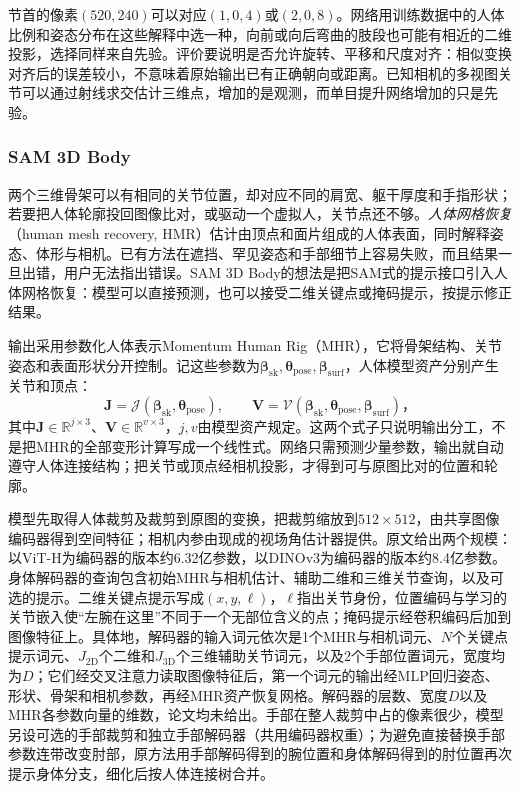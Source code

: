 节首的像素$(520,240)$可以对应$(1,0,4)$或$(2,0,8)$。网络用训练数据中的人体比例和姿态分布在这些解释中选一种，向前或向后弯曲的肢段也可能有相近的二维投影，选择同样来自先验。评价要说明是否允许旋转、平移和尺度对齐：相似变换对齐后的误差较小，不意味着原始输出已有正确朝向或距离。已知相机的多视图关节可以通过射线求交估计三维点，增加的是观测，而单目提升网络增加的只是先验。

\subsubsection{SAM 3D Body}
\label{sec:vision-recognition-sam3d-body}

两个三维骨架可以有相同的关节位置，却对应不同的肩宽、躯干厚度和手指形状；若要把人体轮廓投回图像比对，或驱动一个虚拟人，关节点还不够。\emph{人体网格恢复}（human mesh recovery, HMR）估计由顶点和面片组成的人体表面，同时解释姿态、体形与相机。已有方法在遮挡、罕见姿态和手部细节上容易失败，而且结果一旦出错，用户无法指出错误。SAM 3D Body的想法是把SAM式的提示接口引入人体网格恢复：模型可以直接预测，也可以接受二维关键点或掩码提示，按提示修正结果。

输出采用参数化人体表示Momentum Human Rig（MHR），它将骨架结构、关节姿态和表面形状分开控制。记这些参数为$\bm{\beta}_{\mathrm{sk}},\bm{\theta}_{\mathrm{pose}},\bm{\beta}_{\mathrm{surf}}$，人体模型资产分别产生关节和顶点：
\[
 \bm{J}=\mathcal{J}(\bm{\beta}_{\mathrm{sk}},
                   \bm{\theta}_{\mathrm{pose}}),\qquad
 \bm{V}=\mathcal{V}(\bm{\beta}_{\mathrm{sk}},
                   \bm{\theta}_{\mathrm{pose}},
                   \bm{\beta}_{\mathrm{surf}})\text{，}
\]
其中$\bm{J}\in\mathbb{R}^{j\times3}$、$\bm{V}\in\mathbb{R}^{v\times3}$，$j,v$由模型资产规定。这两个式子只说明输出分工，不是把MHR的全部变形计算写成一个线性式。网络只需预测少量参数，输出就自动遵守人体连接结构；把关节或顶点经相机投影，才得到可与原图比对的位置和轮廓。

模型先取得人体裁剪及裁剪到原图的变换，把裁剪缩放到$512\times512$，由共享图像编码器得到空间特征；相机内参由现成的视场角估计器提供。原文给出两个规模：以ViT-H为编码器的版本约6.32亿参数，以DINOv3为编码器的版本约8.4亿参数。身体解码器的查询包含初始MHR与相机估计、辅助二维和三维关节查询，以及可选的提示。二维关键点提示写成$(x,y,\ell)$，$\ell$指出关节身份，位置编码与学习的关节嵌入使“左腕在这里”不同于一个无部位含义的点；掩码提示经卷积编码后加到图像特征上。具体地，解码器的输入词元依次是1个MHR与相机词元、$N$个关键点提示词元、$J_{2\mathrm D}$个二维和$J_{3\mathrm D}$个三维辅助关节词元，以及2个手部位置词元，宽度均为$D$；它们经交叉注意力读取图像特征后，第一个词元的输出经MLP回归姿态、形状、骨架和相机参数，再经MHR资产恢复网格。解码器的层数、宽度$D$以及MHR各参数向量的维数，论文均未给出。手部在整人裁剪中占的像素很少，模型另设可选的手部裁剪和独立手部解码器（共用编码器权重）；为避免直接替换手部参数连带改变肘部，原方法用手部解码得到的腕位置和身体解码得到的肘位置再次提示身体分支，细化后按人体连接树合并。

